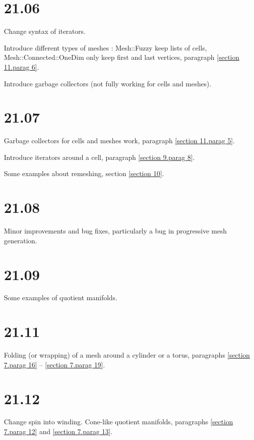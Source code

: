 \documentclass[a4paper]{scrreprt}
\def\numb{}
\newcommand\verm[1]{\textcolor{manif}{#1}}
\renewcommand\tt{\normalfont\ttfamily}
\begin{document}
\section*{21.06}

\noindent Change syntax of iterators.

\noindent Introduce different types of meshes :
{\small\tt\verm{Mesh}::Fuzzy} keep lists of cells,
{\small\tt\verm{Mesh}::Connected::OneDim} only keep first and last vertices,
paragraph \ref{\numb section 11.\numb parag 6}.

\noindent Introduce garbage collectors (not fully working for cells and meshes).


\section*{21.07}

\noindent Garbage collectors for cells and meshes work,
paragraph \ref{\numb section 11.\numb parag 5}.

\noindent Introduce iterators around a cell, paragraph \ref{\numb section 9.\numb parag 8}.

\noindent Some examples about remeshing, section \ref{\numb section 10}.


\section*{21.08}

\noindent Minor improvements and bug fixes, particularly a bug in progressive mesh generation.


\section*{21.09}

\noindent Some examples of quotient manifolds.


\section*{21.11}

\noindent Folding (or wrapping) of a mesh around a cylinder or a torus, paragraphs
\ref{\numb section 7.\numb parag 16} -- \ref{\numb section 7.\numb parag 19}.


\section*{21.12}

\noindent Change {\small\tt spin} into {\small\tt winding}.
Cone-like quotient manifolds, paragraphs \ref{\numb section 7.\numb parag 12} and
\ref{\numb section 7.\numb parag 13}.
\end{document}

